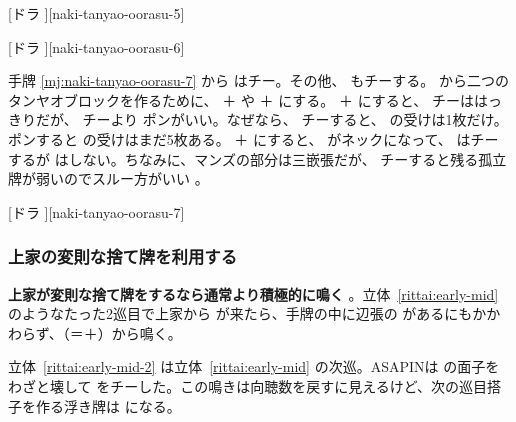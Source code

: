 \documentclass[../nankiru_main.tex]{subfiles}
\begin{document}
[ドラ ][naki-tanyao-oorasu-5]

[ドラ ][naki-tanyao-oorasu-6]

手牌 \ref{mj:naki-tanyao-oorasu-7} から  はチー。その他、 もチーする。 から二つのタンヤオブロックを作るために、 ＋  や  ＋  にする。 ＋  にすると、 チーははっきりだが、 チーより  ポンがいい。なぜなら、 チーすると、 の受けは1枚だけ。ポンすると  の受けはまだ5枚ある。 ＋  にすると、 がネックになって、 はチーするが  はしない。ちなみに、マンズの部分は三嵌張だが、 チーすると残る孤立牌が弱いのでスルー方がいい \citep[][pp.~55--56]{kawamura-naki}。

[ドラ ][naki-tanyao-oorasu-7]


\subsubsection*{上家の変則な捨て牌を利用する}

\textbf{上家が変則な捨て牌をするなら通常より積極的に鳴く} \citep{hououlab-1}。立体~\ref{rittai:early-mid} のようなたった2巡目で上家から  が来たら、手牌の中に辺張の  があるにもかかわらず、（＝＋）から鳴く。

\begin{rittai}[h]
  \centering
  
  
  \caption{上家がたった2巡目で中張牌の  を切る場合}
  \label{rittai:early-mid}
\end{rittai}

立体~\ref{rittai:early-mid-2} は立体~\ref{rittai:early-mid} の次巡。ASAPINは  の面子をわざと壊して  をチーした。この鳴きは向聴数を戻すに見えるけど、次の巡目搭子を作る浮き牌は  になる。

\begin{rittai}[h]
  \centering
  
  
  \caption{次巡で上家が  を切る場合}
  \label{rittai:early-mid-2}
\end{rittai}
\end{document}
